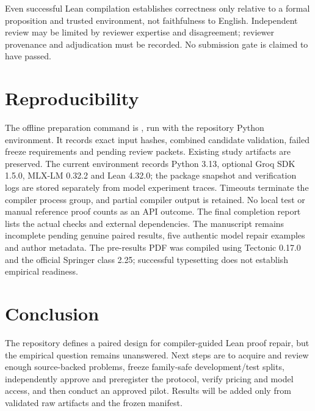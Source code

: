 \documentclass[runningheads,a4paper]{llncs}
\begin{document}
Even successful Lean compilation establishes correctness only relative to a
formal proposition and trusted environment, not faithfulness to English.
Independent review may be limited by reviewer expertise and disagreement;
reviewer provenance and adjudication must be recorded. No submission gate is
claimed to have passed.

\section{Reproducibility}
The offline preparation command is
,
run with the repository Python environment. It records exact input hashes,
combined candidate validation, failed freeze requirements and pending review
packets. Existing study artifacts are preserved. The current environment
records Python 3.13, optional Groq SDK 1.5.0, MLX-LM 0.32.2 and Lean 4.32.0; the package snapshot and
verification logs are stored separately from model experiment traces.
Timeouts terminate the compiler process group, and partial compiler output
is retained. No local test or manual reference proof counts as an API outcome.
The final completion report lists the actual checks and external dependencies.
The manuscript remains incomplete pending genuine paired results, five
authentic model repair examples and author metadata. The pre-results PDF was
compiled using Tectonic 0.17.0 and the official Springer class 2.25; successful
typesetting does not establish empirical readiness.

\section{Conclusion}
The repository defines a paired design for compiler-guided Lean proof repair,
but the empirical question remains unanswered. Next steps are to acquire and
review enough source-backed problems, freeze family-safe development/test
splits, independently approve and preregister the protocol, verify pricing and
model access, and then conduct an approved pilot. Results will be added only
from validated raw artifacts and the frozen manifest.



\end{document}
